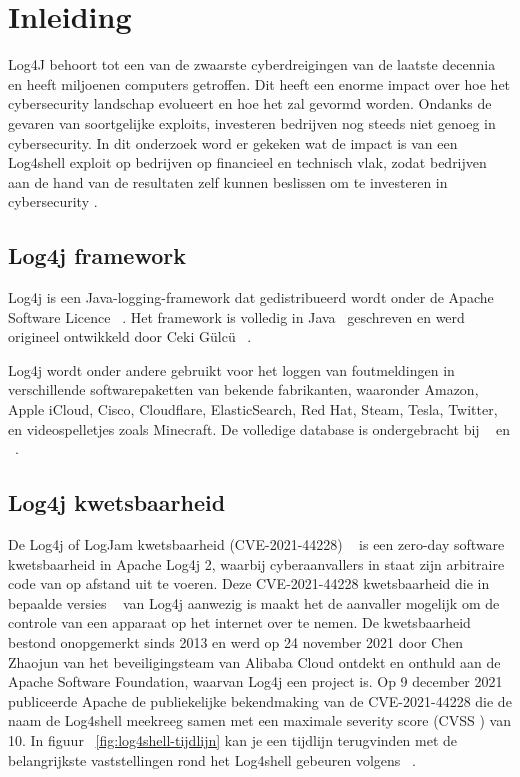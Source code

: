 \documentclass{hogent-article}
\affiliation{
    \textsuperscript{1} \href{mailto:kadir.akkurt@student.hogent.be}{kadira.akkurt@student.hogent.be}
}
\affiliation{
    \textsuperscript{2} \href{mailto:thomas.thomas@student.hogent.be}{thomas.thoma@student.hogent.be}
}
\begin{document}
\flushbottom 
\maketitle 
\tableofcontents 
\thispagestyle{empty} 

\section{Inleiding}

Log4J behoort tot een van de zwaarste cyberdreigingen van de laatste decennia en heeft miljoenen computers getroffen. Dit heeft een enorme impact over hoe het cybersecurity landschap evolueert en hoe het zal gevormd worden. Ondanks de gevaren van soortgelijke exploits, investeren bedrijven nog steeds niet genoeg in cybersecurity.
In dit onderzoek word er gekeken wat de impact is van een Log4shell exploit op bedrijven op financieel en technisch vlak, zodat bedrijven aan de hand van de resultaten zelf kunnen beslissen om te investeren in cybersecurity .

\subsection{Log4j framework}

Log4j is een Java-logging-framework dat gedistribueerd wordt onder de Apache Software Licence ~\autocite{Apache2022a}. Het framework is volledig in Java~\autocite{Oracle2022} geschreven en werd origineel ontwikkeld door Ceki Gülcü ~\autocite{Gülcü2002}.

Log4j wordt onder andere gebruikt voor het loggen van foutmeldingen in verschillende softwarepaketten van bekende fabrikanten, waaronder Amazon, Apple iCloud, Cisco, Cloudflare, ElasticSearch, Red Hat, Steam, Tesla, Twitter, en videospelletjes zoals Minecraft. De volledige database is ondergebracht bij ~\textcite{CISA2022} en ~\textcite{NCSCN2022}.

\subsection{Log4j kwetsbaarheid}

De Log4j of LogJam kwetsbaarheid (CVE-2021-44228) ~\autocite{Apache2022c} is een zero-day software kwetsbaarheid in Apache Log4j 2, waarbij cyberaanvallers in staat zijn arbitraire code van op afstand uit te voeren. Deze CVE-2021-44228 kwetsbaarheid die in bepaalde versies ~\autocite{Apache2022b} van Log4j aanwezig is maakt het de aanvaller mogelijk om de controle van een apparaat op het internet over te nemen.  
De kwetsbaarheid bestond onopgemerkt sinds 2013 en werd op 24 november 2021 door Chen Zhaojun van het beveiligingsteam van Alibaba Cloud ontdekt en onthuld aan de Apache Software Foundation, waarvan Log4j een project is.
Op 9 december 2021 publiceerde Apache de publiekelijke bekendmaking van de CVE-2021-44228 die de naam de Log4shell meekreeg samen met een maximale severity score (CVSS \autocite{FIRST2022}) van 10.
In figuur ~\ref{fig:log4shell-tijdlijn} kan je een tijdlijn terugvinden met de belangrijkste vaststellingen rond het Log4shell gebeuren volgens ~\textcite{Hiesgen2022}. 
\end{document}
